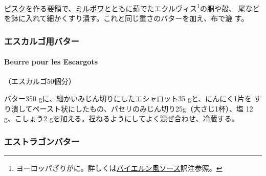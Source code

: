 \begin{recette}

\protect\hyperlink{}{ビスク}を作る要領で、\protect\hyperlink{mirepoix}{ミルポワ}とともに茹でたエクルヴィス\footnote{ヨーロッパざりがに。詳しくは\protect\hyperlink{sauce-bavaroise}{バイエルン風ソース}訳注参照。}の胴や殻、
尾などを鉢に入れて細かくすり潰す。これと同じ重さのバターを加え、布で漉
す。

\maeaki

\hypertarget{ux30a8ux30b9ux30abux30ebux30b4ux7528ux30d0ux30bfux30fc}{%
\subsubsection{エスカルゴ用バター}\label{ux30a8ux30b9ux30abux30ebux30b4ux7528ux30d0ux30bfux30fc}}

\hypertarget{beurre-pour-les-escargots}{%
\paragraph{Beurre pour les Escargots}\label{beurre-pour-les-escargots}}


（エスカルゴ50個分）

バター350 gに、細かいみじん切りにしたエシャロット35 gと、にんにく1片を
すり潰してペースト状にしたもの、パセリのみじん切り25g（大さじ1杯）、塩
12 g、こしょう2 gを加える。捏ねるようにしてよく混ぜ合わせ、冷蔵する。

\maeaki

\hypertarget{ux30a8ux30b9ux30c8ux30e9ux30b4ux30f3ux30d0ux30bfux30fc}{%
\subsubsection{エストラゴンバター}\label{ux30a8ux30b9ux30c8ux30e9ux30b4ux30f3ux30d0ux30bfux30fc}}


\end{recette}
